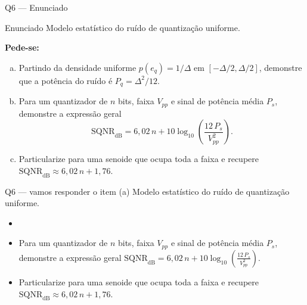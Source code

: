 \documentclass[aspectratio=169]{beamer}
\newcommand{\SQNR}{\mathrm{SQNR}}
\begin{document}
\begin{frame}[allowframebreaks]{Q6 --- Enunciado}
  \small
  \begin{block}{Enunciado}
  Modelo estatístico do ruído de quantização uniforme.
  \end{block}
  \vspace{0.1cm}
  \textbf{Pede-se:}
  \begin{enumerate}[(a)]
    \item Partindo da densidade uniforme $p(e_q)=1/\Delta$ em $[-\Delta/2,\Delta/2]$, demonstre que a potência do ruído é $P_q=\Delta^2/12$.
    \item Para um quantizador de $n$ bits, faixa $V_{pp}$ e sinal de potência média $P_s$, demonstre a expressão geral \[ \SQNR_{\text{dB}}=6{,}02\,n+10\log_{10}\!\left(\frac{12\,P_s}{V_{pp}^2}\right). \]
    \item Particularize para uma senoide que ocupa toda a faixa e recupere $\SQNR_{\text{dB}}\approx 6{,}02\,n+1{,}76$.
  \end{enumerate}
\end{frame}

\begin{frame}{Q6 --- vamos responder o item (a)}
  \small
  \textcolor{gray!55}{Modelo estatístico do ruído de quantização uniforme.}
  \vspace{0.35cm}
  \begin{itemize}
    \item[\textcolor{unbprimary}{(a)}] 
    \item[\textcolor{gray!55}{(b)}] \textcolor{gray!55}{Para um quantizador de $n$ bits, faixa $V_{pp}$ e sinal de potência média $P_s$, demonstre a expressão geral \( \SQNR_{\text{dB}}=6{,}02\,n+10\log_{10}\!\left(\frac{12\,P_s}{V_{pp}^2}\right). \)}
    \item[\textcolor{gray!55}{(c)}] \textcolor{gray!55}{Particularize para uma senoide que ocupa toda a faixa e recupere $\SQNR_{\text{dB}}\approx 6{,}02\,n+1{,}76$.}
  \end{itemize}
\end{frame}
\end{document}
